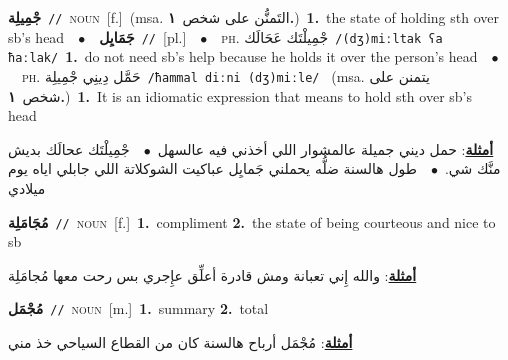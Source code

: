 \documentclass[10pt,a4paper,twoside]{article} %
\begin{document}
\begin{multicols}{2}
{\setlength\topsep{0pt}\textbf{\foreignlanguage{arabic}{جْمِيلِة}}\ {\color{gray}\texttt{//}\color{black}}\ \textsc{noun}\ [f.]\ \color{gray}(msa. \foreignlanguage{arabic}{التَمنُّن على شخص}~\foreignlanguage{arabic}{\textbf{١.}})\color{black}\ \textbf{1.}~the state of holding sth over sb's head\ \ $\bullet$\ \ \setlength\topsep{0pt}\textbf{\foreignlanguage{arabic}{جَمَايِل}}\ {\color{gray}\texttt{//}\color{black}}\ [pl.]\ \ $\bullet$\ \ \textsc{ph.} \color{gray} \foreignlanguage{arabic}{جْمِيلْتَك عَحَالَك}\color{black}\ {\color{gray}\texttt{/{\sffamily (dʒ)miːltak ʕa ħaːlak}/}\color{black}}\ \textbf{1.}~do not need sb's help because he holds it over the person's head\ \ $\bullet$\ \ \textsc{ph.} \color{gray} \foreignlanguage{arabic}{حَمَّل دِينِي جْمِيلِة}\color{black}\ {\color{gray}\texttt{/{\sffamily ħammal diːni (dʒ)miːle}/}\color{black}}\ \color{gray} (msa. \foreignlanguage{arabic}{يتمنن على شخص}~\foreignlanguage{arabic}{\textbf{١.}})\color{black}\ \textbf{1.}~It is an idiomatic expression that means to hold sth over sb's head\  \begin{flushright}\color{gray}\foreignlanguage{arabic}{\textbf{\underline{\foreignlanguage{arabic}{أمثلة}}}: حمل ديني جميلة عالمشوار اللي أخذني فيه عالسهل\ $\bullet$\ \  جْمِيلْتَك عحالَك بديش منَّك شي.\ $\bullet$\ \  طول هالسنة ضلُّه يحملني جَمايِل عباكيت الشوكلاتة اللي جابلي اياه يوم ميلادي}\end{flushright}\color{black}} \vspace{2mm}

{\setlength\topsep{0pt}\textbf{\foreignlanguage{arabic}{مُجَامَلِة}}\ {\color{gray}\texttt{//}\color{black}}\ \textsc{noun}\ [f.]\ \textbf{1.}~compliment  \textbf{2.}~the state of being courteous and nice to sb\  \begin{flushright}\color{gray}\foreignlanguage{arabic}{\textbf{\underline{\foreignlanguage{arabic}{أمثلة}}}: والله إِني تعبانة ومش قادرة أعلِّق عإِجري بس رحت معها مُجامَلِة}\end{flushright}\color{black}} \vspace{2mm}

{\setlength\topsep{0pt}\textbf{\foreignlanguage{arabic}{مُجْمَل}}\ {\color{gray}\texttt{//}\color{black}}\ \textsc{noun}\ [m.]\ \textbf{1.}~summary  \textbf{2.}~total\  \begin{flushright}\color{gray}\foreignlanguage{arabic}{\textbf{\underline{\foreignlanguage{arabic}{أمثلة}}}: مُجْمَل أرباح هالسنة كان من القطاع السياحي خذ مني}\end{flushright}\color{black}} \vspace{2mm}


\end{multicols}
\end{document}
